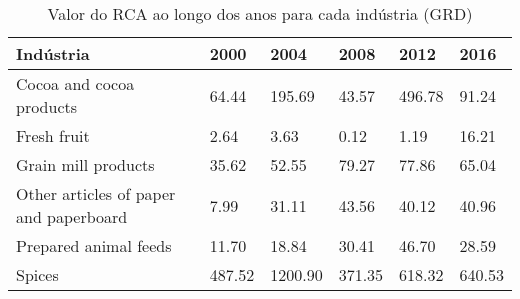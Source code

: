 \begin{table}
\centering
\caption{Valor do RCA ao longo dos anos para cada indústria (GRD)}
\begin{tabular}{p{6cm}p{1.5cm}p{1.5cm}p{1.5cm}p{1.5cm}p{1.5cm}}
\toprule
                             Indústria &   2000 &    2004 &   2008 &   2012 &   2016 \\
\midrule
              Cocoa and cocoa products &  64.44 &  195.69 &  43.57 & 496.78 &  91.24 \\
                           Fresh fruit &   2.64 &    3.63 &   0.12 &   1.19 &  16.21 \\
                   Grain mill products &  35.62 &   52.55 &  79.27 &  77.86 &  65.04 \\
Other articles of paper and paperboard &   7.99 &   31.11 &  43.56 &  40.12 &  40.96 \\
                 Prepared animal feeds &  11.70 &   18.84 &  30.41 &  46.70 &  28.59 \\
                                Spices & 487.52 & 1200.90 & 371.35 & 618.32 & 640.53 \\
\bottomrule
\end{tabular}
\end{table}
